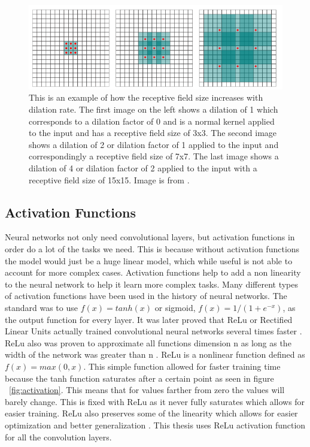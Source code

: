 \begin{figure}[tbh]
\centering
\includegraphics[width=\textwidth]{dilated_convolutions.png}
\caption{This is an example of how the receptive field size increases with dilation rate. The first image on the left shows a dilation of 1 which corresponds to a dilation factor of 0 and is a normal kernel applied to the input and has a receptive field size of 3x3. The second image shows a dilation of 2 or dilation factor of 1 applied to the input and correspondingly a receptive field size of 7x7. The last image shows a dilation of 4 or dilation factor of 2 applied to the input with a receptive field size of 15x15. Image is from \cite{Yu2016MultiScaleCA}. }
\label{fig_dil_convolution}
\end{figure}     

\subsection{Activation Functions}    
    Neural networks not only need convolutional layers, but activation functions in order do a lot of the tasks we need.
    This is because without activation functions the model would just be a huge linear model, which while useful is not able to account for more complex cases.
    Activation functions help to add a non linearity to the neural network to help it learn more complex tasks.
    Many different types of activation functions have been used in the history of neural networks. 
    The standard was to use $f(x) = tanh(x)$  or sigmoid, $f(x) = 1/(1+e^{-x})$, as the output function for every layer. 
    It was later proved that ReLu or Rectified Linear Units actually trained convolutional neural networks several times faster \cite{NIPS2012_Krizhevsky}. ReLu also was proven to approximate all functions dimension n as long as the width of the network was greater than n \cite{NIPS2017_ReLuUniversalTheorem}. 
    ReLu is a nonlinear function defined as $f(x) = max(0, x)$. 
    This simple function allowed for faster training time because the tanh function saturates after a certain point as seen in figure ~\ref{fig:activation}. 
    This means that for values farther from zero the values will barely change. 
    This is fixed with ReLu as it never fully saturates which allows for easier training. 
    ReLu also preserves some of the linearity which allows for easier optimization and better generalization \cite{Goodfellow-et-al-2016}. 
    This thesis uses ReLu activation function for all the convolution layers.

